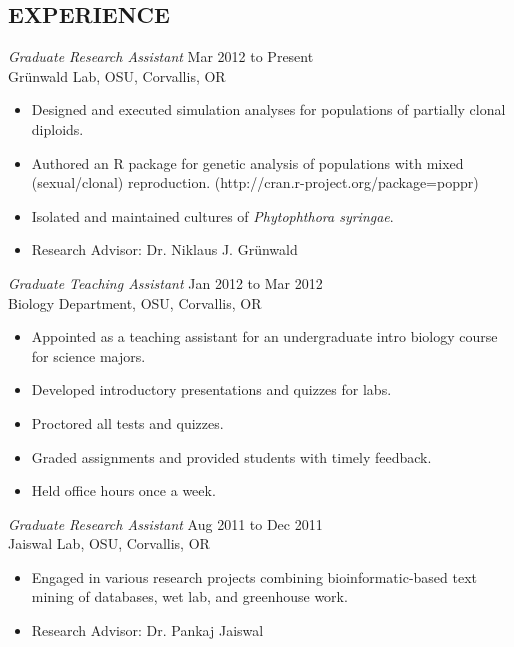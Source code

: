 \documentclass[margin, 10pt]{res} %
\begin{document}
\begin{resume}
 
\section{EXPERIENCE}

{\sl Graduate Research Assistant} \hfill Mar 2012 to Present \\
Gr\"unwald Lab, OSU, Corvallis, OR

\begin{itemize} \itemsep -2pt %
\item Designed and executed simulation analyses for populations of partially clonal diploids. 
\item Authored an R package for genetic analysis of populations with mixed \\(sexual/clonal) reproduction. (http://cran.r-project.org/package=poppr)
\item Isolated and maintained cultures of \textit{Phytophthora syringae}.
\item Research Advisor: Dr. Niklaus J. Gr\"unwald
\end{itemize}
 
{\sl Graduate Teaching Assistant} \hfill Jan 2012 to Mar 2012 \\
Biology Department, OSU, Corvallis, OR 
\begin{itemize} \itemsep -2pt %
\item Appointed as a teaching assistant for an undergraduate intro biology course for science majors.
\item Developed introductory presentations and quizzes for labs.
\item Proctored all tests and quizzes.
\item Graded assignments and provided students with timely feedback.
\item Held office hours once a week.
\end{itemize} 

{\sl Graduate Research Assistant} \hfill Aug 2011 to Dec 2011 \\
Jaiswal Lab, OSU, Corvallis, OR
\begin{itemize} \itemsep -2pt %
\item Engaged in various research projects combining bioinformatic-based text mining of databases, wet lab, and greenhouse work.
\item Research Advisor: Dr. Pankaj Jaiswal
\end{itemize} 


\end{resume}
\end{document}
